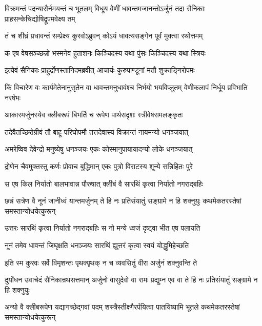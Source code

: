 \threelineshloka
{विक्रमन्तं पदन्यासैर्नमयन्तं च भूतलम्}
{विधूय वेणीं धावन्तमजानन्तोऽर्जुनं तदा}
{सैनिकाः प्राहसन्केचिद्योषिद्रूपमवेक्ष्य तम्}


\twolineshloka
{तं च शीघ्रं प्रधावन्तं सम्प्रेक्ष्य कुरवोऽब्रुवन्}
{कोऽयं धावत्यसङ्गेन पूर्वं मुक्त्वा रथोत्तमम्}


\twolineshloka
{क एष वेषसञ्च्छन्नो भस्मनेव हुताशनः}
{किञ्चिदस्य यथा पुंसः किञ्चिदस्य यथा स्त्रियः}


\twolineshloka
{इत्येवं सैनिकाः प्राहुर्द्रोणस्तानिदमब्रवीत्}
{आचार्यः कुरुपाण्डूनां मतौ शुक्राङ्गिरोपमः}


\threelineshloka
{किं विचारेण वः कार्यमेतेनानुसृतेन वा}
{धावन्तमनुधावंश्च निर्भयो भयविप्लुतम्}
{वेणीकलापं निर्धूय प्रविभाति नरर्षभः}


\twolineshloka
{आकारमर्जुनस्येव क्लीबरूपं बिभर्ति च}
{रूपेण पार्थसदृशः स्त्रीवेषसमलङ्कृतः}


\twolineshloka
{तदेवैतच्छिरोग्रीवं तौ बाहू परिघोपमौ}
{तत्तदेवास्य विक्रान्तं नायमन्यो धनञ्जयात्}


\twolineshloka
{अमरेष्विव देवेन्द्रो मनुष्येषु धनञ्जयः}
{एकः कोस्मानुपायायादन्यो लोके धनञ्जयात्}


\twolineshloka
{द्रोणेन चैवमुक्तस्तु कर्णः प्रोवाच बुद्धिमान्}
{एकः पुत्रो विराटस्य शून्ये सन्निहितः पुरे}


\twolineshloka
{स एष किल निर्यातो बालभावान्न पौरुषात्}
{क्लीबं वै सारथिं कृत्वा निर्यातो नगराद्बहिः}


\threelineshloka
{छन्नं सत्रेण वै नूनं जानीध्वं यान्तमर्जुनम्}
{ते हि नः प्रतिसंयातुं सङ्ग्रामे न हि शक्नुयुः}
{कथमेकतरस्तेषां समस्तान्योधयेत्कुरून्}


\twolineshloka
{उत्तरः सारथिं कृत्वा निर्यातो नगराद्बहिः}
{स नो मन्ये ध्वजं दृष्ट्वा भीत एष पलायति}




\twolineshloka
{नूनं तमेव धावन्तं जिघृक्षति धनञ्जयः}
{सारथिं ह्युत्तरं कृत्वा स्वयं योद्धुमिहेच्छति}



\twolineshloka
{इति स्म कुरवः सर्वे विमृशन्तः पृथक्पृथक्}
{न च व्यवसितुं वीरा अर्जुनं शक्नुवन्ति ते}


\threelineshloka
{दुर्योधन उवाचेदं सैनिकान्रथसत्तमान्}
{अर्जुनो वासुदेवो वा रामः प्रद्युम्न एव वा}
{ते हि नः प्रतिसंयातुं सङ्ग्रामे न हि शक्नुयुः}


\threelineshloka
{अन्यो वै क्लीबरूपेण यद्यागच्छेद्गवां पदम्}
{शस्त्रैस्तीक्ष्णैरर्पयित्वा पातयिष्यामि भूतले}
{कथमेकतरस्तेषां समस्तान्योधयेत्कुरून्}


